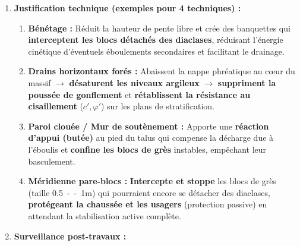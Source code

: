 \documentclass[11pt]{article}
\begin{document}
\begin{exercice}
\begin{enumerate}
\begin{enumerate}
      \item \textbf{Drainage :} \textbf{Drains horizontaux forés} (long. \SI{10}{--15}{m}, pente \SI{5}{\%}) depuis les banquettes vers l'intérieur du massif pour abaisser la nappe ; \textbf{Fossé de pied} étanche + caniveau pour évacuer l'eau.
      \item \textbf{Soutènement :} \textbf{Paroi clouée} (clous passifs \SI{6}{--9}{m}, treillis, béton projeté) sur la face reprofilée, ou \textbf{Mur en L} au pied si emprise limitée.
      \item \textbf{Revégétalisation :} Hydro-ensemencement sur banquettes + plantation d'arbres à racines pivotantes (ex: \emph{Acacia}, \emph{Eucalyptus}) en haut de talus.
      \item \textbf{Protection passive :} \textbf{Méridienne pare-blocs} (filet câblé \SI{2000}{kJ} ou barrière rigide) au pied du talus, devant la chaussée, pour arrêter les blocs résiduels.
      \end{enumerate}
\item \textbf{Justification technique (exemples pour 4 techniques) :}
      \begin{enumerate}
      \item \textbf{Bénétage :} Réduit la hauteur de pente libre et crée des banquettes qui \textbf{interceptent les blocs détachés des diaclases}, réduisant l'énergie cinétique d'éventuels éboulements secondaires et facilitant le drainage.
      \item \textbf{Drains horizontaux forés :} Abaissent la nappe phréatique au cœur du massif $\rightarrow$ \textbf{désaturent les niveaux argileux} $\rightarrow$ \textbf{suppriment la poussée de gonflement} et \textbf{rétablissent la résistance au cisaillement} ($c', \varphi'$) sur les plans de stratification.
      \item \textbf{Paroi clouée / Mur de soutènement :} Apporte une \textbf{réaction d'appui (butée)} au pied du talus qui compense la décharge due à l'éboulis et \textbf{confine les blocs de grès} instables, empêchant leur basculement.
      \item \textbf{Méridienne pare-blocs :} \textbf{Intercepte et stoppe} les blocs de grès (taille \SI{0,5}{--1}{m}) qui pourraient encore se détacher des diaclases, \textbf{protégeant la chaussée et les usagers} (protection passive) en attendant la stabilisation active complète.
      \end{enumerate}
\item \textbf{Surveillance post-travaux :}
      \begin{enumerate}

\end{enumerate}
\end{enumerate}
\end{exercice}
\end{document}
